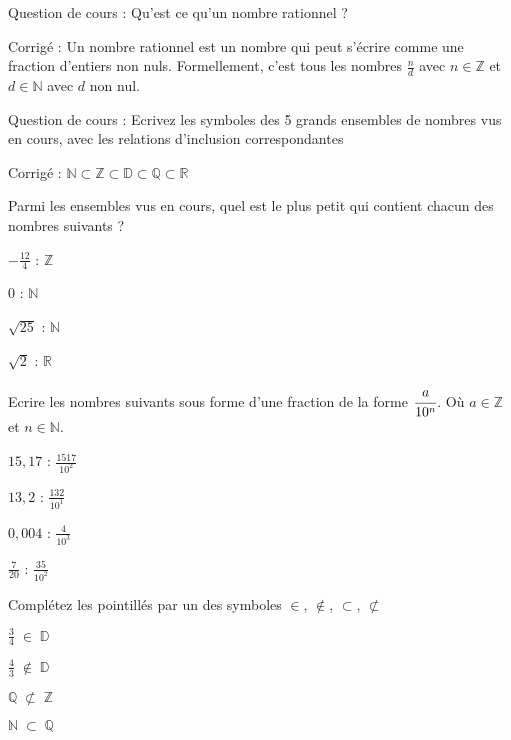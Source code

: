 \documentclass[10pt,a4paper]{exam}
\newcommand{\N}{\mathbb{N}}
\newcommand{\Z}{\mathbb{Z}}
\newcommand{\D}{\mathbb{D}}
\newcommand{\Q}{\mathbb{Q}}
\newcommand{\R}{\mathbb{R}}
\begin{document}
Question de cours : Qu'est ce qu'un nombre rationnel ?\newline

Corrigé : Un nombre rationnel est un nombre qui peut s'écrire comme une fraction d'entiers non nuls. Formellement, c'est tous les nombres  $\frac{n}{d}$ avec $n \in \Z$ et $d \in \N$ avec $d$ non nul.

  
 
Question de cours : Ecrivez les symboles des 5 grands ensembles de nombres vus en cours, avec les relations d'inclusion correspondantes\newline

Corrigé : $\N \subset \Z \subset \D \subset \Q \subset \R$

Parmi les ensembles vus en cours, quel est le plus petit qui contient chacun des nombres suivants ?
\begin{multicols}{4}
 \item $-\frac{12}{4}$ : $\Z$
 \item $0$ : $\N$
 \item $\sqrt{25}$ : $\N$
 \item $\sqrt{2}$ : $\R$
\end{multicols}
 
 
Ecrire les nombres suivants sous forme d'une fraction de la forme 
$\cfrac{a}{10^{n}}$. Où $a\in\Z$ et $n\in\N$.
\begin{multicols}{4}
 \item $15{,}17$ : $\frac{1517}{10^2}$
 \item $13{,}2$ : $\frac{132}{10^1}$
 \item $0{,}004$ : $\frac{4}{10^3}$
 \item $\frac{7}{20}$ : $\frac{35}{10^2}$
\end{multicols}
 


Complétez les pointillés par un des symboles $\in$, $\notin$, $\subset$, $\not\subset$
\begin{multicols}{4}
    \item $\frac{3}{4}\;\in \;\mathbb{D}$
    \item $\frac{4}{3}\;\notin \;\mathbb{D}$
    \item $\mathbb{Q}\;\not\subset \;\mathbb{Z}$
    \item $\mathbb{N}\;\subset\;\mathbb{Q}$
\end{multicols}
 
 
\end{document}
